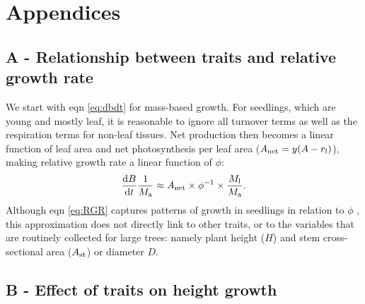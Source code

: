 \documentclass[a4paper,11pt]{article}
\begin{document}
\clearpage

\section{Appendices}
\subsection{A - Relationship between traits and relative growth rate} \label{app:traits-RGR}

We start with eqn \ref{eq:dbdt} for mass-based growth. For seedlings, which are
young and mostly leaf, it is reasonable to ignore all turnover terms as
well as the respiration terms for non-leaf tissues. Net production then
becomes a linear function of leaf area and net photosynthesis per leaf
area ($A_\textrm{net} = y(A - r_{\rm l})$), making relative growth
rate a linear function of $\phi$:
\begin{equation}\label{eq:RGR}
\frac{{\rm d}B}{{\rm d}t}\frac{1}{M_{\rm a}}  \approx A_\textrm{net} \times \phi^{-1} \times \frac{M_{\rm l}}{M_{\rm a}}. \end{equation}
Although eqn \ref{eq:RGR} captures patterns of growth in seedlings in
relation to $\phi$ \citep{Wright-2000}, this
approximation does not directly link to other traits, or to the
variables that are routinely collected for large trees: namely plant
height ($H$) and stem cross-sectional area ($A_{\rm st}$) or
diameter $D$.

\subsection{B - Effect of traits on height growth} \label{app:traits-RGR}
\end{document}
